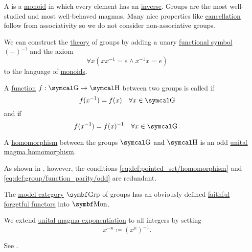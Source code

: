\begin{definition}\label{def:group}
  A  is a \hyperref[def:unital_magma/associative]{monoid} in which every element has an \hyperref[def:unital_magma_inverse_element]{inverse}. Groups are the most well-studied and most well-behaved magmas. Many nice properties like \hyperref[thm:group_properties/cancellative]{cancellation} follow from associativity so we do not consider non-associative groups.

  \begin{DefEnum}
     We can construct the \hyperref[def:first_order_theory]{theory} of groups by adding a unary \hyperref[def:first_order_logic_language/func]{functional symbol} \( (-)^{-1} \) and the axiom
    \begin{equation}\label{eq:def:group/theory/inverse_axiom}
      \forall x (xx^{-1} = e \wedge x^{-1}x = e)
    \end{equation}
    to the language of \hyperref[def:unital_magma/associative]{monoids}.

     A \hyperref[def:function/single_valued]{function} \( f: \CG \to \CH \) between two groups is called  if
    \begin{equation}\label{eq:def:group/function_parity/even}
      f(x^{-1}) = f(x) \quad\forall x \in \CG
    \end{equation}
    and  if
    \begin{equation}\label{eq:def:group/function_parity/odd}
      f(x^{-1}) = f(x)^{-1} \quad\forall x \in \CG.
    \end{equation}

     A \hyperref[def:first_order_homomorphism]{homomorphism} between the groups \( \CG \) and \( \CH \) is an odd \hyperref[def:unital_magma/homomorphism]{unital magma homomorphism}.

    As shown in , however, the conditions \eqref{eq:def:pointed_set/homomorphism} and \eqref{eq:def:group/function_parity/odd} are redundant.

     The \hyperref[def:first_order_model_category]{model category} \( \Cat{Grp} \) of groups has an obviously defined \hyperref[def:faithful_full_functor]{faithful} \hyperref[def:forgetful_functor]{forgetful functors} into \hyperref[def:unital_magma/associative]{\( \Cat{Mon} \)}.

     We extend \hyperref[def:unital_magma/exponentiation]{unital magma exponentiation} to all integers by setting
    \begin{equation*}
      x^{-n} \coloneqq (x^n)^{-1}.
    \end{equation*}

    See .
  \end{DefEnum}
\end{definition}

